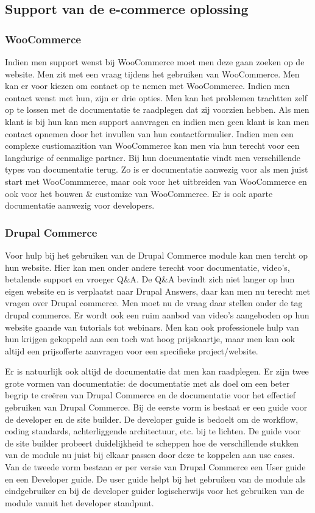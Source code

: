\subsection{Support van de e-commerce oplossing}
\subsubsection{WooCommerce}
Indien men support wenst bij WooCommerce moet men deze gaan zoeken op de website. Men zit met een vraag tijdens het gebruiken van WooCommerce. Men kan er voor kiezen om contact op te nemen met WooCommerce. Indien men contact wenst met hun, zijn er drie opties. Men kan het problemen trachtten zelf op te lossen met de documentatie te raadplegen dat zij voorzien hebben. Als men klant is bij hun kan men support aanvragen en indien men geen klant is kan men contact opnemen door het invullen van hun contactformulier. Indien men een complexe custiomazition van WooCommerce kan men via hun terecht voor een langdurige of eenmalige partner. Bij hun documentatie vindt men verschillende types van documentatie terug. Zo is er documentatie aanwezig voor als men juist start met WooCommmerce, maar ook voor het uitbreiden van WooCommerce en ook voor het bouwen \& customize van WooCommerce. Er is ook aparte documentatie aanwezig voor developers.
\subsubsection{Drupal Commerce}
Voor hulp bij het gebruiken van de Drupal Commerce module kan men tercht op hun website. Hier kan men onder andere terecht voor documentatie, video's, betalende support en vroeger Q\&A. De Q\&A bevindt zich niet langer op hun eigen website en is verplaatst naar Drupal Answers, daar kan men nu terecht met vragen over Drupal commerce. Men moet nu de vraag daar stellen onder de tag drupal commerce. Er wordt ook een ruim aanbod van video's aangeboden op hun website gaande van tutorials tot webinars. Men kan ook professionele hulp van hun krijgen gekoppeld aan een toch wat hoog prijskaartje, maar men kan ook altijd een prijsofferte aanvragen voor een specifieke project/website.

Er is natuurlijk ook altijd de documentatie dat men kan raadplegen. Er zijn twee grote vormen van documentatie: de documentatie met als doel om een beter begrip te creëren van Drupal Commerce en de documentatie voor het effectief gebruiken van Drupal Commerce. Bij de eerste vorm is bestaat er een guide voor de developer en de site builder. De developer guide is bedoelt om de workflow, coding standards, achterliggende architectuur, etc. bij te lichten. De guide voor de site builder probeert duidelijkheid te scheppen hoe de verschillende stukken van de module nu juist bij elkaar passen door deze te koppelen aan use cases. Van de tweede vorm bestaan er per versie van Drupal Commerce een User guide en een Developer guide. De user guide helpt bij het gebruiken van de module als eindgebruiker en bij de developer guider logischerwijs voor het gebruiken van de module vanuit het developer standpunt.
